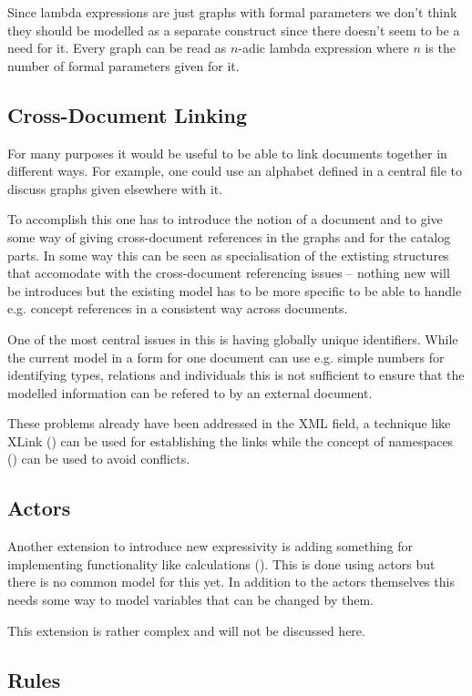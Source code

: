 \documentclass{article}
\begin{document}
Since lambda expressions are just graphs with formal parameters we
don't think they should be modelled as a separate construct since there
doesn't seem to be a need for it. Every graph can be read as $n$-adic
lambda expression where $n$ is the number of formal parameters given
for it.

\subsection{Cross-Document Linking}

For many purposes it would be useful to be able to link documents
together in different ways. For example, one could use an alphabet
defined in a central file to discuss graphs given elsewhere with it.

To accomplish this one has to introduce the notion of a document and to give
some way of giving cross-document references in the graphs and for the
catalog parts. In some way this can be seen as specialisation of the
extisting structures that accomodate with the cross-document
referencing issues -- nothing new will be introduces but the existing
model has to be more specific to be able to handle e.g. concept
references in a consistent way across documents.

One of the most central issues in this is having globally unique
identifiers.  While the current model in a form for one document can
use e.g. simple numbers for identifying types, relations and
individuals this is not sufficient to ensure that the modelled
information can be refered to by an external document.

These problems already have been addressed in the XML field, a
technique like XLink (\cite{XLink}) can be used for establishing the
links while the concept of namespaces (\cite{XML-NS}) can be used
to avoid conflicts.

\subsection{Actors}

Another extension to introduce new expressivity is adding something
for implementing functionality like calculations (\cite{So98}). This
is done using actors but there is no common model for this
yet. In addition to the actors themselves this needs some way to model
variables that can be changed by them.

This extension is rather complex and will not be discussed here.

\subsection{Rules}
\end{document}
